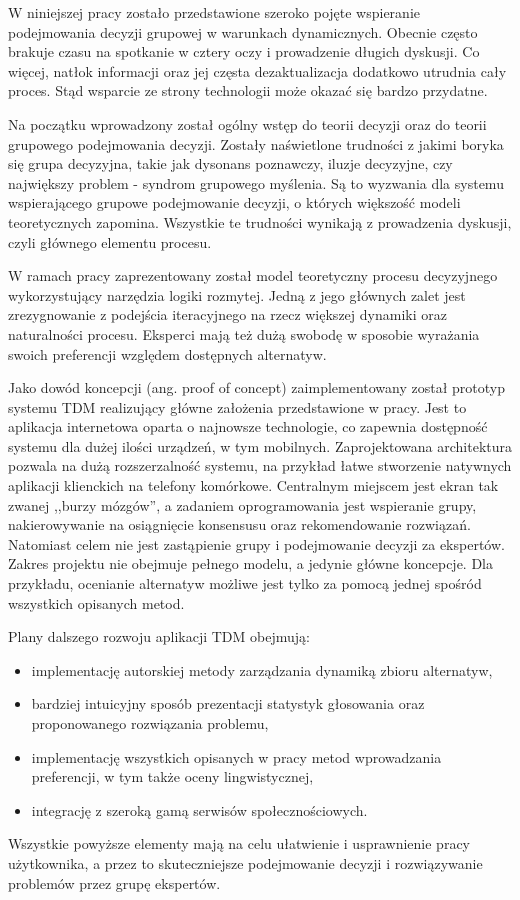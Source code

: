 W niniejszej pracy zostało przedstawione szeroko pojęte wspieranie podejmowania
decyzji grupowej w warunkach dynamicznych. Obecnie często brakuje
czasu na spotkanie w cztery oczy i prowadzenie długich dyskusji. Co więcej,
natłok informacji oraz jej częsta dezaktualizacja dodatkowo utrudnia cały
proces. Stąd wsparcie ze strony technologii może okazać się bardzo przydatne.

Na początku wprowadzony został ogólny wstęp do teorii decyzji oraz do teorii
grupowego podejmowania decyzji. Zostały naświetlone trudności z jakimi boryka
się grupa decyzyjna, takie jak dysonans poznawczy, iluzje decyzyjne, czy
największy problem - syndrom grupowego myślenia. Są to wyzwania dla systemu
wspierającego grupowe podejmowanie decyzji, o których większość modeli
teoretycznych zapomina. Wszystkie te trudności wynikają z prowadzenia dyskusji,
czyli głównego elementu procesu.

W ramach pracy zaprezentowany został model teoretyczny procesu decyzyjnego
wykorzystujący narzędzia logiki rozmytej. Jedną z jego głównych zalet jest
zrezygnowanie z podejścia iteracyjnego na rzecz większej dynamiki oraz
naturalności procesu. Eksperci mają też dużą swobodę w sposobie wyrażania swoich
preferencji względem dostępnych alternatyw.

Jako dowód koncepcji (ang. proof of concept) zaimplementowany został prototyp
systemu TDM realizujący główne założenia przedstawione w pracy. Jest to
aplikacja internetowa oparta o najnowsze technologie, co zapewnia dostępność
systemu dla dużej ilości urządzeń, w tym mobilnych. Zaprojektowana
architektura pozwala na dużą rozszerzalność systemu, na przykład łatwe
stworzenie natywnych aplikacji klienckich na telefony komórkowe. Centralnym
miejscem jest ekran tak zwanej ,,burzy mózgów'', a zadaniem oprogramowania jest
wspieranie grupy, nakierowywanie na osiągnięcie konsensusu oraz rekomendowanie
rozwiązań. Natomiast celem nie jest zastąpienie grupy i podejmowanie decyzji za
ekspertów. Zakres projektu nie obejmuje pełnego modelu, a jedynie główne
koncepcje. Dla przykładu, ocenianie alternatyw możliwe jest tylko za pomocą
jednej spośród wszystkich opisanych metod.

Plany dalszego rozwoju aplikacji TDM obejmują:
\begin{itemize}
  \item implementację autorskiej metody zarządzania dynamiką zbioru alternatyw,
  \item bardziej intuicyjny sposób prezentacji statystyk głosowania oraz
  proponowanego rozwiązania problemu,
  \item implementację wszystkich opisanych w pracy metod wprowadzania
  preferencji, w tym także oceny lingwistycznej,
  \item integrację z szeroką gamą serwisów społecznościowych.
\end{itemize}
Wszystkie powyższe elementy mają na celu ułatwienie i usprawnienie pracy
użytkownika, a przez to skuteczniejsze podejmowanie decyzji i rozwiązywanie
problemów przez grupę ekspertów.


